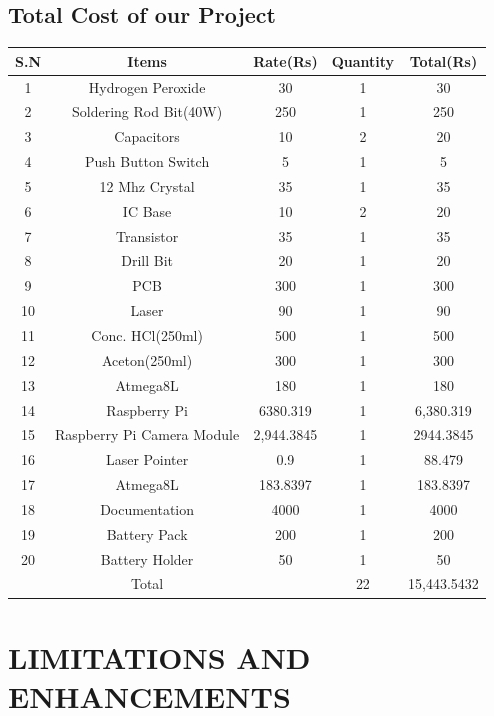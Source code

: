 \documentclass[12pt, a4paper]{article}
\begin{document}
\subsection{Total Cost of our Project}
\begin{tabular}{|c|c|c|c|c|}
\hline
	S.N & Items & Rate(Rs) & Quantity & Total(Rs) \\
\hline
	1 & Hydrogen Peroxide & 30 & 1 & 30 \\
\hline
	2 & Soldering Rod Bit(40W) & 250 & 1 & 250 \\
\hline
	3 & Capacitors & 10 & 2 & 20 \\
\hline
	4 & Push Button Switch & 5 & 1 & 5 \\
\hline
	5 & 12 Mhz Crystal & 35 & 1 & 35 \\
\hline
	6 & IC Base & 10 & 2 & 20 \\
\hline
	7 & Transistor & 35 & 1 & 35 \\
\hline
	8 & Drill Bit & 20 & 1 & 20 \\
\hline
	9 & PCB & 300 & 1 & 300 \\
\hline
	10 & Laser & 90 & 1 & 90 \\
\hline
	11 & Conc. HCl(250ml) & 500 & 1 & 500 \\
\hline
	12 & Aceton(250ml) & 300 & 1 & 300 \\
\hline
	13 & Atmega8L & 180 & 1 & 180 \\
\hline
	14 & Raspberry Pi & 6380.319 & 1 & 6,380.319 \\
\hline
	15 & Raspberry Pi Camera Module & 2,944.3845 & 1 & 2944.3845 \\
\hline
	16 & Laser Pointer &  0.9 & 1 & 88.479 \\
\hline 
    17 & Atmega8L & 183.8397 & 1 & 183.8397 \\
\hline
	18 & Documentation &  4000 & 1 & 4000 \\
\hline
	19 & Battery Pack & 200 & 1 & 200 \\
\hline 
    20 & Battery Holder & 50 & 1 & 50 \\
\hline 
	   & Total & & 22 & 15,443.5432\\
\hline	   
\end{tabular}
\newpage
\section{LIMITATIONS AND ENHANCEMENTS}
\end{document}
